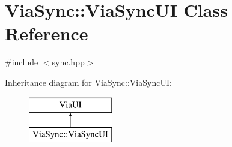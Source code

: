 \hypertarget{class_via_sync_1_1_via_sync_u_i}{}\section{Via\+Sync\+:\+:Via\+Sync\+UI Class Reference}
\label{class_via_sync_1_1_via_sync_u_i}


{\ttfamily \#include $<$sync.\+hpp$>$}

Inheritance diagram for Via\+Sync\+:\+:Via\+Sync\+UI\+:\begin{figure}[H]
\begin{center}
\leavevmode
\includegraphics[height=2.000000cm]{class_via_sync_1_1_via_sync_u_i}
\end{center}
\end{figure}
